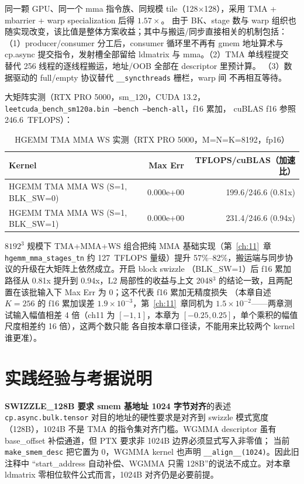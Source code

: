 同一颗 GPU、同一个 mma 指令族、同规模 tile（128$\times$128），采用 TMA + mbarrier + warp specialization 后得 $1.57\times$。
由于 BK、stage 数与 warp 组织也随实现改变，该比值是整体方案收益；其中与搬运/同步直接相关的机制包括：
（1）producer/consumer 分工后，consumer 循环里不再有 gmem 地址算术与
cp.async 提交指令，发射槽全部留给 ldmatrix 与 mma。（2）TMA 单线程提交
替代 256 线程的逐线程搬运，地址/OOB 全部在 descriptor 里预计算。
（3）数据驱动的 full/empty 协议替代 \texttt{\_\allowbreak{}\_\allowbreak{}syncthreads} 栅栏，warp 间
不再相互等待。

大矩阵实测（RTX PRO 5000，sm\_120，CUDA 13.2，
\texttt{leetcuda\_\allowbreak{}bench\_\allowbreak{}sm120a.\allowbreak{}bin\allowbreak{} --bench\allowbreak{} --bench-all}，f16 累加，
cuBLAS f16 参照 246.6~TFLOPS）：

\begin{table}[H]
\centering
\caption{HGEMM TMA MMA WS 实测（RTX PRO 5000，M=N=K=8192，fp16）}
\label{tab:ch14-perf}
\small
\begin{tabular}{lrr}
\toprule
Kernel & Max Err & TFLOPS/cuBLAS（加速比） \\
\midrule
HGEMM TMA MMA WS (S=1, BLK\_SW=0) & 0.000e+00 & 199.6/246.6 (0.81x) \\
HGEMM TMA MMA WS (S=1, BLK\_SW=1) & 0.000e+00 & 231.4/246.6 (0.94x) \\
\bottomrule
\end{tabular}
\end{table}

$8192^3$ 规模下 TMA+MMA+WS 组合把纯 MMA 基础实现（第~\ref{ch:11}~章
\texttt{hgemm\_\allowbreak{}mma\_\allowbreak{}stages\_\allowbreak{}tn} 约 127~TFLOPS 量级）提升
57\%--82\%，搬运端与同步协议的升级在大矩阵上依然成立。开启 block swizzle
（BLK\_SW=1）后 f16 累加路径从 0.81x 提升到 0.94x，L2 局部性的收益与上文
2048$^3$ 的结论一致，且两配置在该批输入下 Max Err 为 0；这不代表 f16 累加无精度损失
（本章自述 $K{=}256$ 的 f16 累加误差 $1.9\times10^{-3}$，第~\ref{ch:11}~章同机为
$1.5\times10^{-2}$——两章测试输入幅值相差 4 倍（ch11 为 $[-1,1]$，本章为 $[-0.25,0.25]$，单个乘积的幅值尺度相差约 16 倍），这两个数只能
各自按本章口径读，不能用来比较两个 kernel 谁更准）。

\section{实践经验与考据说明}

\begin{kaogu}[F2·2026-10-27 修正]{\textbf{SWIZZLE\_128B 要求 smem 基地址 1024 字节对齐}的表述}
  \texttt{cp.\allowbreak{}async.\allowbreak{}bulk.\allowbreak{}tensor} 对目的地址的硬性要求是对齐到
  swizzle 模式宽度（128B），1024B 不是 TMA 的指令集对齐门槛。WGMMA descriptor
  虽有 base\_offset 补偿通道，但 PTX 要求非 1024B 边界必须显式写入非零值；
  当前 \texttt{make\_\allowbreak{}smem\_\allowbreak{}desc} 把它置为 0，WGMMA kernel 也声明
  \texttt{\_\allowbreak{}\_\allowbreak{}align\_\allowbreak{}\_\allowbreak{}(1024)}。因此旧注释中
  “start\_address 自动补偿、WGMMA 只需 128B”的说法不成立。对本章 ldmatrix
  零相位软件公式而言，1024B 对齐仍是必要前提。
\end{kaogu}

